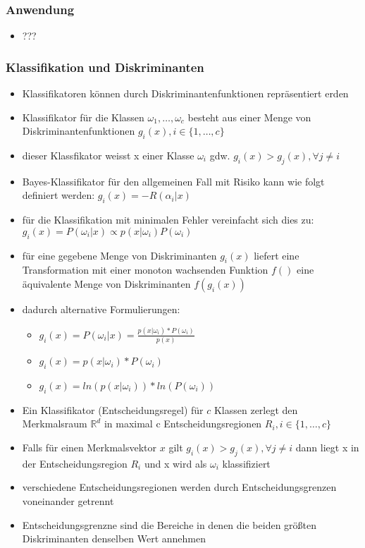 \documentclass{article} %
\begin{document}
		\subsubsection{Anwendung}
		\begin{itemize}
			\item ???
		\end{itemize}
		\subsubsection{Klassifikation und Diskriminanten}
		\begin{itemize}
			\item Klassifikatoren können durch Diskriminantenfunktionen repräsentiert erden
			\item Klassifikator für die Klassen $\omega_1,\dots,\omega_c$ besteht aus einer Menge von Diskriminantenfunktionen $g_i(x),i\in\{1,\dots,c\}$
			\item dieser Klassfikator weisst x einer Klasse $\omega_i$ gdw. $g_i(x) > g_j(x), \forall j\neq i$
			\item Bayes-Klassifikator für den allgemeinen Fall mit Risiko kann wie folgt definiert werden: $g_i(x) = -R(\alpha_i|x)$
			\item für die Klassifikation mit minimalen Fehler vereinfacht sich dies zu: $g_i(x) = P(\omega_i|x) \propto p(x|\omega_i)P(\omega_i)$
			\item für eine gegebene Menge von Diskriminanten $g_i(x)$ liefert eine Transformation mit einer monoton wachsenden Funktion $f()$ eine äquivalente Menge von Diskriminanten $f(g_i(x))$
			\item dadurch alternative Formulierungen:
			\begin{itemize}
				\item $g_i(x) = P(\omega_i|x) = \frac{p(x|\omega_i)*P(\omega_i)}{p(x)}$
				\item $g_i(x) =p(x|\omega_i)*P(\omega_i)$
				\item $g_i(x) = ln(p(x|\omega_i))*ln(P(\omega_i))$
			\end{itemize}
			\item Ein Klassifikator (Entscheidungsregel) für $c$ Klassen zerlegt den Merkmalsraum $\mathbb{R}^d$ in maximal c Entscheidungsregionen $R_i,i\in \{1,\dots,c\}$
			\item Falls für einen Merkmalsvektor $x$ gilt $g_i(x) > g_j(x),\forall j\neq i$ dann liegt x in der Entscheidungsregion $R_i$ und x wird als $\omega_i$ klassifiziert
			\item verschiedene Entscheidungsregionen werden durch Entscheidungsgrenzen voneinander getrennt
			\item Entscheidungsgrenzne sind die Bereiche in denen die beiden größten Diskriminanten denselben Wert annehmen
		\end{itemize}
\end{document}
